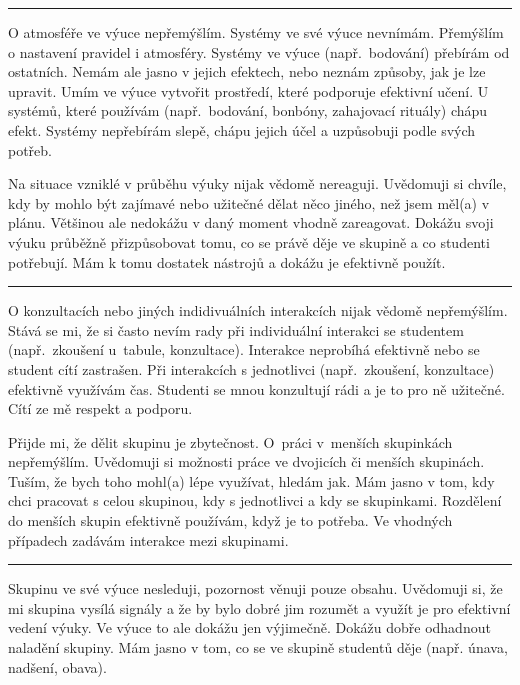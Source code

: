 \rule{\textwidth}{0.4pt}
{O atmosféře ve výuce nepřemýšlím. Systémy ve své výuce nevnímám.}
{Přemýšlím o nastavení pravidel i atmosféry. Systémy ve výuce (např.\ bodování) přebírám od ostatních. Nemám ale jasno v jejich efektech, nebo neznám způsoby, jak je lze upravit.}
{Umím ve výuce vytvořit prostředí, které podporuje efektivní učení. U systémů, které používám (např.\ bodování, bonbóny, zahajovací rituály) chápu efekt. Systémy nepřebírám slepě, chápu jejich účel a uzpůsobuji podle svých potřeb.}

\newpage
{}
{Na situace vzniklé v průběhu výuky nijak vědomě nereaguji.}
{Uvědomuji si chvíle, kdy by mohlo být zajímavé nebo užitečné dělat něco jiného, než jsem měl(a) v plánu. Většinou ale nedokážu v daný moment vhodně zareagovat.}
{Dokážu svoji výuku průběžně přizpůsobovat tomu, co se právě děje ve skupině a co studenti potřebují. Mám k tomu dostatek nástrojů a dokážu je efektivně použít.}

\rule{\textwidth}{0.4pt}
{O konzultacích nebo jiných indidivuálních interakcích nijak vědomě nepřemýšlím.}
{Stává se mi, že si často nevím rady při individuální interakci se studentem (např.\ zkoušení u~tabule, konzultace). Interakce neprobíhá efektivně nebo se student cítí zastrašen.}
{Při interakcích s jednotlivci (např.\ zkoušení, konzultace) efektivně využívám čas. Studenti se mnou konzultují rádi a je to pro ně užitečné. Cítí ze mě respekt a podporu.}

\newpage
{}
{Přijde mi, že dělit skupinu je zbytečnost. O~práci v~menších skupinkách nepřemýšlím.}
{Uvědomuji si možnosti práce ve dvojicích či menších skupinách. Tuším, že bych toho mohl(a) lépe využívat, hledám jak.}
{Mám jasno v tom, kdy chci pracovat s celou skupinou, kdy s jednotlivci a kdy se skupinkami. Rozdělení do menších skupin efektivně používám, když je to potřeba. Ve vhodných případech zadávám interakce mezi skupinami.}

\rule{\textwidth}{0.4pt}
{Skupinu ve své výuce nesleduji, pozornost věnuji pouze obsahu.}
{Uvědomuji si, že mi skupina vysílá signály a že by bylo dobré jim rozumět a využít je pro efektivní vedení výuky. Ve výuce to ale dokážu jen výjimečně.}
{Dokážu dobře odhadnout naladění skupiny. Mám jasno v tom, co se ve skupině studentů děje (např. únava, nadšení, obava).}
